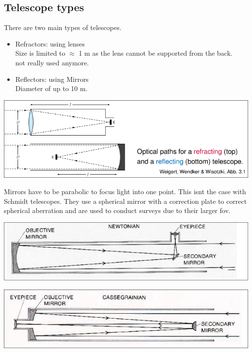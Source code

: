 \documentclass[11pt,a4paper]{article}
\begin{document}
\subsection{Telescope types}
There are two main types of telescopes. 
\begin{itemize}
    \item Refractors: using lenses \\ 
        Size is limited to $\approx$ 1 m as the lens cannot be supported from the back.\\ 
        not really used anymore.
    \item Reflectors: using Mirrors  \\ 
        Diameter of up to 10 m.
\end{itemize}
\begin{center}
    \includegraphics[width=\linewidth]{screenshot_2024-01-13-191726.png}
\end{center}
Mirrors have to be parabolic to focus light into one point.
This isnt the case with Schmidt telescopes.
They use a spherical mirror with a correction plate to correct spherical aberration and are used to conduct surveys due to their larger fov.
\begin{center}
    \includegraphics[width=\linewidth]{screenshot_2024-01-13-192049.png}
\end{center}
\begin{center}
    \includegraphics[width=\linewidth]{screenshot_2024-01-13-192236.png}
\end{center}
\end{document}
